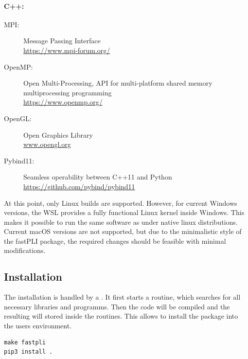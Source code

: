 \paragraph{C++:}
\begin{description}
\item[MPI:] Message Passing Interface \cite{message2015mpi}\\
\url{https://www.mpi-forum.org/}
\item[OpenMP:] Open Multi-Processing, API for multi-platform shared memory multiprocessing programming \cite{dagum1998openmp}\\
\url{https://www.openmp.org/}
\item[OpenGL:] Open Graphics Library \cite{khronos}\\
\url{www.opengl.org}
\item[Pybind11:] Seamless operability between C++11 and Python \cite{pybind11}\\ \url{https://github.com/pybind/pybind11} 
\end{description}
%
% 
At this point, only Linux builds are supported.
However, for current Windows versions, the \ac{WSL} provides a fully functional Linux kernel inside Windows.
This makes it possible to run the same software as under native linux distributions.
Current macOS versions are not supported, but due to the minimalistic style of the \ac{fastPLI} package, the required changes should be feasible with minimal modifications.
% 
% 
% 
\subsection{Installation}
% 
The installation is handled by a .
It first starts a  routine, which searches for all necessary libraries and programms.
Then the \cpp{} code will be compiled and the resulting  will stored inside the \python{} routines.
This allows \python{} to install the package into the users environment.
% 
\begin{lstfloat}[!ht]
\lstset{style=common}
\begin{lstlisting}
make fastpli
pip3 install .
\end{lstlisting}
\end{lstfloat}
% 
% 
% 
